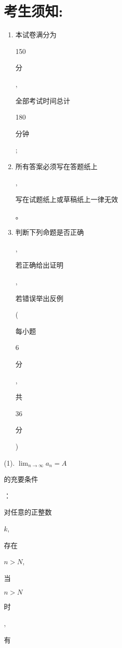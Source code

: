 \documentclass[10pt]{article}
\begin{document}
\section{考生须知:}
\begin{enumerate}
  \item \begin{CJK}{UTF8}{mj}本试卷满分为\end{CJK} 150 \begin{CJK}{UTF8}{mj}分\end{CJK}, \begin{CJK}{UTF8}{mj}全部考试时间总计\end{CJK} 180 \begin{CJK}{UTF8}{mj}分钟\end{CJK};

  \item \begin{CJK}{UTF8}{mj}所有答案必须写在答题纸上\end{CJK}, \begin{CJK}{UTF8}{mj}写在试题纸上或草稿纸上一律无效\end{CJK}。

  \item \begin{CJK}{UTF8}{mj}判断下列命题是否正确\end{CJK}, \begin{CJK}{UTF8}{mj}若正确给出证明\end{CJK}, \begin{CJK}{UTF8}{mj}若错误举出反例\end{CJK} (\begin{CJK}{UTF8}{mj}每小题\end{CJK} 6 \begin{CJK}{UTF8}{mj}分\end{CJK}, \begin{CJK}{UTF8}{mj}共\end{CJK} 36 \begin{CJK}{UTF8}{mj}分\end{CJK})

\end{enumerate}
(1). $\lim _{n \rightarrow \infty} a_{n}=A$ \begin{CJK}{UTF8}{mj}的充要条件\end{CJK}：\begin{CJK}{UTF8}{mj}对任意的正整数\end{CJK} $k$, \begin{CJK}{UTF8}{mj}存在\end{CJK} $n>N$, \begin{CJK}{UTF8}{mj}当\end{CJK} $n>N$ \begin{CJK}{UTF8}{mj}时\end{CJK}, \begin{CJK}{UTF8}{mj}有\end{CJK}
\end{document}
